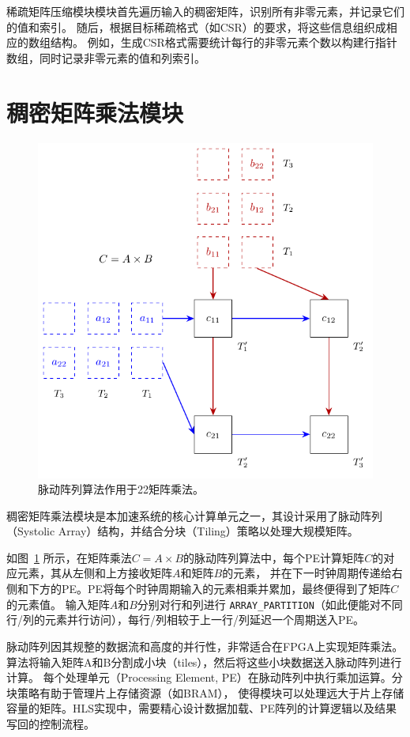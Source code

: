 稀疏矩阵压缩模块模块首先遍历输入的稠密矩阵，识别所有非零元素，并记录它们的值和索引。
随后，根据目标稀疏格式（如CSR）的要求，将这些信息组织成相应的数组结构。
例如，生成CSR格式需要统计每行的非零元素个数以构建行指针数组，同时记录非零元素的值和列索引。

\section{稠密矩阵乘法模块}

\begin{figure}[htbp]
\centerline{\includegraphics[width=0.8\columnwidth]{figures/systolic}}
\caption{脉动阵列算法作用于2\texttimes{}2矩阵乘法。}
\label{fig:systolic}
\end{figure}

稠密矩阵乘法模块是本加速系统的核心计算单元之一，其设计采用了脉动阵列（Systolic Array）结构，并结合分块（Tiling）策略以处理大规模矩阵。

如图~\ref{fig:systolic} 所示，在矩阵乘法\(C=A\times B\)的脉动阵列算法中，每个PE计算矩阵\(C\)的对应元素，其从左侧和上方接收矩阵\(A\)和矩阵\(B\)的元素，
并在下一时钟周期传递给右侧和下方的PE。PE将每个时钟周期输入的元素相乘并累加，最终便得到了矩阵\(C\)的元素值。
输入矩阵\(A\)和\(B\)分别对行和列进行 \verb|ARRAY_PARTITION|（如此便能对不同行/列的元素并行访问），每行/列相较于上一行/列延迟一个周期送入PE。

脉动阵列因其规整的数据流和高度的并行性，非常适合在FPGA上实现矩阵乘法。
算法将输入矩阵A和B分割成小块（tiles），然后将这些小块数据送入脉动阵列进行计算。
每个处理单元（Processing Element, PE）在脉动阵列中执行乘加运算。分块策略有助于管理片上存储资源（如BRAM），
使得模块可以处理远大于片上存储容量的矩阵。HLS实现中，需要精心设计数据加载、PE阵列的计算逻辑以及结果写回的控制流程。

